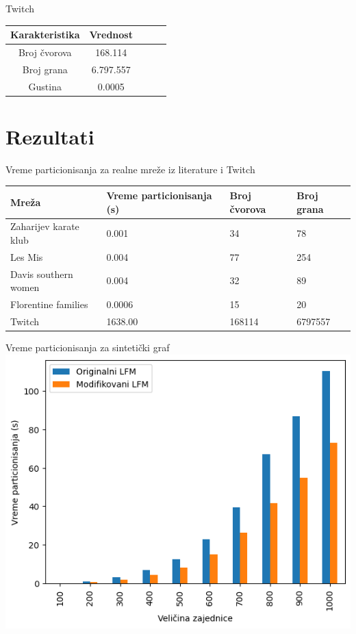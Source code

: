 \documentclass{beamer}
\begin{document}
\begin{frame}{Twitch}
    \centering
    \begin{tabular}{|c|c|c|c|c|}
        \hline
        \textbf{Karakteristika} & \textbf{Vrednost} \\
        \hline
        Broj čvorova & 168.114 \\
        Broj grana & 6.797.557 \\
        Gustina & 0.0005 \\
        \hline
    \end{tabular}
\end{frame}

\section{Rezultati}
\begin{frame}{Vreme particionisanja za realne mreže iz literature i Twitch}
    \centering
    \begin{table}
        \label{tab:4.2}
        \begin{tabular}{p{1.4in}p{1in}p{0.5in}p{0.5in}}
        Mreža & Vreme particionisanja (s)& Broj čvorova & Broj grana \\
        \hline
        Zaharijev karate klub & 0.001 & 34 & 78 \\
        Les Mis & 0.004 & 77 & 254 \\
        Davis southern women & 0.004 & 32 & 89 \\
        Florentine families & 0.0006 & 15 & 20 \\
        Twitch  & 1638.00 & 168114 & 6797557 \\
    \end{tabular}
\end{table}
\end{frame}
    
\begin{frame}{Vreme particionisanja za sintetički graf}
    \centering
    \includegraphics[height=0.8\textheight]{csv/4.3.png}
\end{frame}
\end{document}
